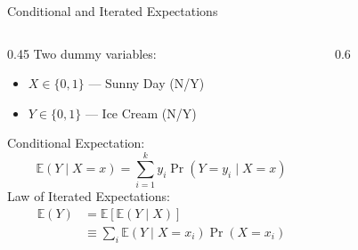 \documentclass[notes,10pt, aspectratio=169]{beamer}
\begin{document}
\begin{frame}{Conditional and Iterated Expectations}
 \begin{columns}
\begin{column}{0.45\textwidth}
Two dummy variables:
    \begin{itemize}
    \item $X \in \{0,1\}$ --- Sunny Day (N/Y)
    \item $Y \in \{0,1\}$ --- Ice Cream (N/Y)
    \end{itemize}
\vspace{.5cm}
Conditional Expectation:
\begin{equation*}
    \mathbb{E}(Y\mid X=x)= \sum^k_{i=1} y_i  \Pr(Y=y_i \mid X=x)
\end{equation*}
Law of Iterated Expectations:
\begin{equation*}
    \begin{aligned}
    \mathbb{E}(Y)&=\mathbb{E}[\mathbb{E}(Y\mid X)]\\
    &\equiv \sum_i \mathbb{E}(Y\mid X=x_i) \Pr(X=x_i)
    \end{aligned}
\end{equation*}

\end{column}
\begin{column}{0.6\textwidth}
\begin{figure}
        \begin{table}
        \end{table}
\vspace{1cm}
\end{figure}
\end{column}
\end{columns}
\end{frame}
\end{document}
